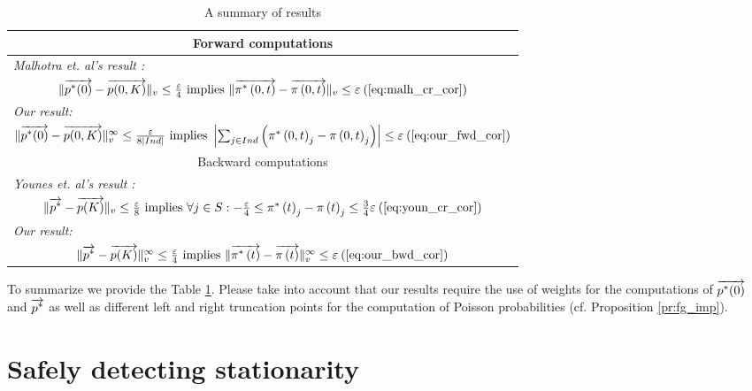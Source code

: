 \documentclass{entcs}
\newcommand{\Section}[1]{\section{#1}}
\begin{document}
		{\small
		\begin{table}
			\caption{A summary of results}
			\label{tbl:summ}
			\begin{center}
				\begin{tabular}{|c|c|}
					\hline
					\multicolumn{2}{|c|}{Forward computations} \\
					\hline
					\multicolumn{2}{|l|}{\emph{Malhotra \emph{et. al}'s result \cite{MalhotraMT_MR94}:}}\\
					\multicolumn{2}{|c|}{$\lVert \overrightarrow{p^{*}(0)} - \overrightarrow{p(0,K)} \rVert_{v} \leq \frac{\varepsilon}{4} \text{ implies } \lVert \overrightarrow{\pi^{*} \left(0, t \right )} - \overrightarrow{\pi \left(0, t \right )} \rVert_{v} \leq \varepsilon \: (\ref{eq:malh_cr_cor})$} \\
					\multicolumn{2}{|l|}{\emph{Our result:}}\\
					\multicolumn{2}{|c|}{$\lVert  \overrightarrow{p^{*}(0)} - \overrightarrow{p(0,K)}  \rVert_{v}^{\infty} \leq \frac{\varepsilon}{8 |Ind|} \text{ implies } \left| \sum_{j \in Ind} \left( \pi^{*} \left(0, t \right )_{j} - \pi \left(0, t \right )_{j} \right) \right| \leq \varepsilon \: (\ref{eq:our_fwd_cor})$}\\
					\hline
					\multicolumn{2}{|c|}{Backward computations} \\
					\hline
					\multicolumn{2}{|l|}{\emph{Younes \emph{et. al}'s result \cite{YounesKNP_STTT05}:}}\\
					\multicolumn{2}{|c|}{$\lVert \overrightarrow{p^{*}} - \overrightarrow{p(K)} \rVert_{v} \leq \frac{\varepsilon}{8} \text{ implies } \forall j \in S : -\frac{\varepsilon}{4} \leq \pi^{*} \left( t \right)_{j} - \pi \left( t \right)_{j} \leq \frac{3}{4}\varepsilon \: (\ref{eq:youn_cr_cor})$}\\
					\multicolumn{2}{|l|}{\emph{Our result:}}\\
					\multicolumn{2}{|c|}{$\lVert  \overrightarrow{p^{*}} - \overrightarrow{p(K)}  \rVert_{v}^{\infty} \leq \frac{\varepsilon}{4} \text{ implies } \lVert  \overrightarrow{\pi^{*} \left( t \right)} - \overrightarrow{\pi \left( t \right) }  \rVert_{v}^{\infty}\leq \varepsilon \: (\ref{eq:our_bwd_cor})$}\\
					\hline
				\end{tabular}
			\end{center}
			\vspace{-0.2cm}
		\end{table}
		}
		To summarize we provide the Table \ref{tbl:summ}. Please take into account that our results require the use of weights for the computations of $\overrightarrow{p^{*}(0)}$ and $\overrightarrow{p^{*}}$ as well as different left and right truncation points for the computation of Poisson probabilities (cf. Proposition \ref{pr:fg_imp}).

\Section{Safely detecting stationarity \label{s:osf}}
	
\end{document}
